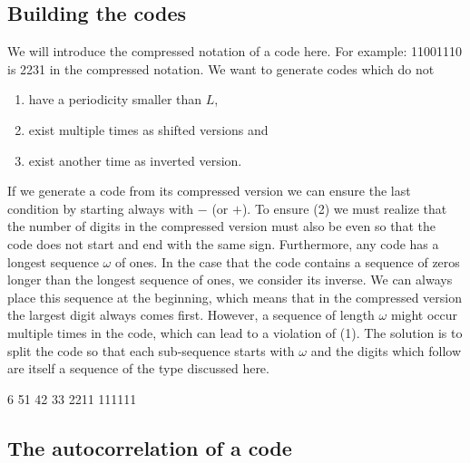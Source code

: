 \documentclass[18pt,a4paper]{extarticle}
\begin{document}
\subsection{Building the codes}
We will introduce the compressed notation of a code here.
For example: 11001110 is 2231 in the compressed notation.
We want to generate codes which do not
\begin{enumerate}
	\item have a periodicity smaller than $L$,
	\item exist multiple times as shifted versions and
	\item exist another time as inverted version.
\end{enumerate}
If we generate a code from its compressed version we can ensure the last condition by starting always with $-$ (or $+$).
To ensure (2) we must realize that the number of digits in the compressed version must also be even so that the code does not start and end with the same sign.
Furthermore, any code has a longest sequence $\omega$ of ones.
In the case that the code contains a sequence of zeros longer than the longest sequence of ones, we consider its inverse.
We can always place this sequence at the beginning, which means that in the compressed version the largest digit always comes first.
However, a sequence of length $\omega$ might occur multiple times in the code, which can lead to a violation of (1).
The solution is to split the code so that each sub-sequence starts with $\omega$ and the digits which follow are itself a sequence of the type discussed here.

6
51
42
33
2211
111111

\subsection{The autocorrelation of a code}
\end{document}

